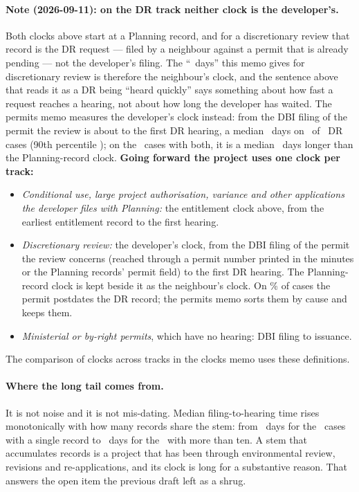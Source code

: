 \documentclass[11pt]{article}
\begin{document}
\paragraph{Note (2026-09-11): on the DR track neither clock is the developer's.} Both clocks
above start at a Planning record, and for a discretionary review that record is the DR request
--- filed by a neighbour against a permit that is already pending --- not the developer's
filing. The ``\acqLagDR\ days'' this memo gives for discretionary review is therefore the
neighbour's clock, and the sentence above that reads it as a DR being ``heard quickly'' says
something about how fast a request reaches a hearing, not about how long the developer has
waited. The permits memo measures the developer's clock instead: from the DBI filing of the
permit the review is about to the first DR hearing, a median \pcDrDbiMed\ days on \pcDrDbiN\ of
\pcDrCases\ DR cases (90th percentile \pcDrDbiPninety); on the \pcDrBothN\ cases with both, it is
a median \pcDrDiffMed\ days longer than the Planning-record clock. \textbf{Going forward the
project uses one clock per track:}
\begin{itemize}
\item \emph{Conditional use, large project authorisation, variance and other applications the
developer files with Planning:} the entitlement clock above, from the earliest entitlement
record to the first hearing.
\item \emph{Discretionary review:} the developer's clock, from the DBI filing of the permit the
review concerns (reached through a permit number printed in the minutes or the Planning
records' permit field) to the first DR hearing. The Planning-record clock is kept beside it as
the neighbour's clock. On \pcDrNegPct\% of cases the permit postdates the DR record; the permits
memo sorts them by cause and keeps them.
\item \emph{Ministerial or by-right permits}, which have no hearing: DBI filing to issuance.
\end{itemize}
The comparison of clocks across tracks in the clocks memo uses these definitions.

\paragraph{Where the long tail comes from.} It is not noise and it is not mis-dating.
Median filing-to-hearing time rises monotonically with how many records share the stem: from
\acqClockTailLow\ days for the \acqClockOneRec\ cases with a single record to
\acqClockTailHigh\ days for the \acqClockManyRec\ with more than ten. A stem that accumulates
records is a project that has been through environmental review, revisions and
re-applications, and its clock is long for a substantive reason. That answers the open item
the previous draft left as a shrug.
\end{document}
